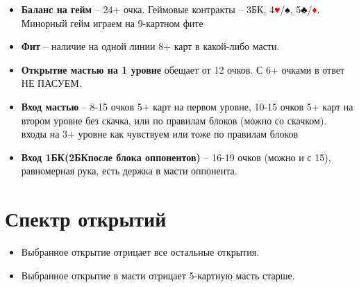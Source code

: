 \documentclass[a4paper,10pt]{article}
\newcommand{\clb}{\textcolor{black}{♣}}
\newcommand{\dia}{\textcolor{red}{♦}}
\newcommand{\hrt}{\textcolor{red}{♥}}
\newcommand{\spd}{\textcolor{black}{♠}}
\newcommand{\NT}{БК}
\begin{document}
\begin{itemize}[label=\textcolor{sputnikRed}{\tiny\(\blacksquare\)}, leftmargin=*, noitemsep]
    \item \textbf{Баланс на гейм} – 24+ очка. Геймовые контракты – 3\NT, 4\hrt/\spd, 5\clb/\dia. Минорный гейм играем на 9-картном фите 
    \item \textbf{Фит} – наличие на одной линии 8+ карт в какой-либо масти.
    \item \textbf{Открытие мастью на 1 уровне} обещает от 12 очков. С 6+ очками в ответ НЕ ПАСУЕМ.
    \item \textbf{Вход мастью} – 8-15 очков 5+ карт на первом уровне, 10-15 очков 5+ карт на втором уровне без скачка, или по правилам блоков (можно со скачком). входы на 3+ уровне как чувствуем или тоже по правилам блоков
    \item \textbf{Вход 1\NT(2\NT после блока оппонентов)} – 16-19 очков (можно и с 15), равномерная рука, есть держка в масти оппонента.
\end{itemize}

\section{Спектр открытий}
\begin{itemize}[label=\textcolor{sputnikRed}{\textbullet}, leftmargin=*, noitemsep]
    \item \textcolor{sputnikRed}{Выбранное открытие отрицает все остальные открытия.} %
    \item \textcolor{sputnikRed}{Выбранное открытие в масти отрицает 5-картную масть старше.}
\end{itemize}
\end{document}
